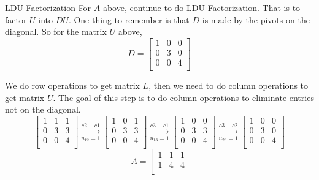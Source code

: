 \documentclass{beamer}
\begin{document}
\begin{frame}{LDU Factorization}
For $A$ above, continue to do LDU Factorization. That is to factor $U$ into $DU$.
One thing to remember is that $D$ is made by the pivots on the diagonal. So for the matrix $U$ above,
\begin{equation*}
    D=\left[ \begin{matrix}
        1&		0&		0\\
        0&		3&		0\\
        0&		0&		4\\
    \end{matrix} \right]
\end{equation*}

We do row operations to get matrix $L$, then we need to do column operations to get matrix $U$. The goal of this step is to do column operations to eliminate entries not on the diagonal.
\begin{equation*}
    \left[ \begin{matrix}
        1&		1&		1\\
        0&		3&		3\\
        0&		0&		4\\
    \end{matrix} \right] \xrightarrow[u_{12}=1]{c2-c1}\left[ \begin{matrix}
        1&		0&		1\\
        0&		3&		3\\
        0&		0&		4\\
    \end{matrix} \right] \xrightarrow[u_{13}=1]{c3-c1}\left[ \begin{matrix}
        1&		0&		0\\
        0&		3&		3\\
        0&		0&		4\\
    \end{matrix} \right] \xrightarrow[u_{23}=1]{c3-c2}\left[ \begin{matrix}
        1&		0&		0\\
        0&		3&		0\\
        0&		0&		4\\
    \end{matrix} \right]
\end{equation*}
\vspace{-1pt}
\begin{equation*}
    A=\left[ \begin{matrix}
        1&		1&		1\\
        1&		4&		4\\

\end{matrix}
\end{equation*}
\end{frame}
\end{document}
